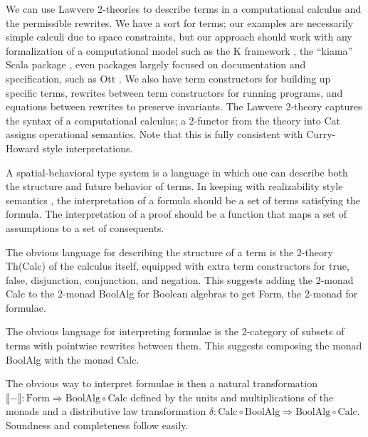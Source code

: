 \documentclass{llncs}
\newcommand{\interp}[1]{\llbracket #1 \rrbracket}
\newcommand{\maps}{\colon}
\newcommand{\Calc}{\mathrm{Calc}}
\newcommand{\BoolAlg}{\mathrm{BoolAlg}}
\renewcommand{\Form}{\mathrm{Form}}
\begin{document}
  We can use Lawvere 2-theories to describe terms in a computational
  calculus and the permissible rewrites.  We have a sort for terms;
  our examples are necessarily simple calculi due to space
  constraints, but our approach should work with any formalization of
  a computational model such as the K framework \cite{DBLP:journals/jlp/RosuS10}, the
  ``kiama'' Scala package \cite{DBLP:conf/gttse/Sloane09}, even packages largely focused
  on documentation and specification, such as Ott
  \cite{DBLP:journals/jfp/SewellNOPRSS10}.  We also have term
  constructors for building up specific terms, rewrites between term
  constructors for running programs, and equations between rewrites to
  preserve invariants.  The Lawvere 2-theory captures the syntax of a
  computational calculus; a 2-functor from the theory into Cat assigns
  operational semantics. Note that this is fully consistent with
  Curry-Howard style interpretations.

  A spatial-behavioral type system is a language in which one can
  describe both the structure and future behavior of terms.  In
  keeping with realizability style semantics
  \cite{Krivine-TheCurryHowardCorre}, the interpretation of a formula
  should be a set of terms satisfying the formula. The interpretation
  of a proof should be a function that maps a set of assumptions to a
  set of consequents.

  The obvious language for describing the structure of a term is the 2-theory Th(Calc) of the calculus itself, equipped with extra term constructors for true, false, disjunction, conjunction, and negation.  This suggests adding the 2-monad Calc to the 2-monad BoolAlg for Boolean algebras to get Form, the 2-monad for formulae.

  The obvious language for interpreting formulae is the 2-category of subsets of terms with pointwise rewrites between them.  This suggests composing the monad BoolAlg with the monad Calc.

  The obvious way to interpret formulae is then a natural transformation $\interp{-} \maps \Form \Rightarrow \BoolAlg \circ \Calc$ defined by the units and multiplications of the monads and a distributive law transformation $\delta\maps \Calc \circ \BoolAlg \Rightarrow \BoolAlg \circ \Calc.$  Soundness and completeness follow easily.
\end{document}
